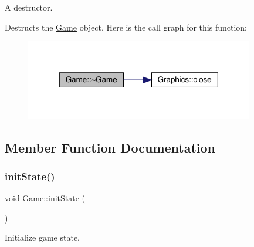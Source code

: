 A destructor. 

Destructs the \mbox{\hyperlink{class_game}{Game}} object. Here is the call graph for this function\+:
\nopagebreak
\begin{figure}[H]
\begin{center}
\leavevmode
\includegraphics[width=283pt]{class_game_ae3d112ca6e0e55150d2fdbc704474530_cgraph}
\end{center}
\end{figure}


\subsection{Member Function Documentation}
\mbox{\label{class_game_a741532226fb50fd8113b0e2a0f162858}} 
\subsubsection{\texorpdfstring{init\+State()}{initState()}}
{\footnotesize\ttfamily void Game\+::init\+State (\begin{DoxyParamCaption}{ }\end{DoxyParamCaption})}



Initialize game state. 

